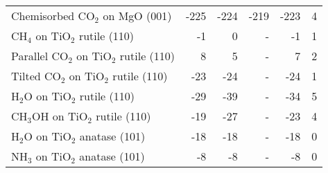 \begin{table}
\begin{adjustbox}{center,max width=1\textwidth}
\begin{tabular}{lrrrrr}
Chemisorbed CO$_2$ on MgO (001) & -225 & -224 & -219 & -223 & 4 \\
CH$_4$ on TiO$_2$ rutile (110) & -1 & 0 & - & -1 & 1 \\
Parallel CO$_2$ on TiO$_2$ rutile (110) & 8 & 5 & - & 7 & 2 \\
Tilted CO$_2$ on TiO$_2$ rutile (110) & -23 & -24 & - & -24 & 1 \\
H$_2$O on TiO$_2$ rutile (110) & -29 & -39 & - & -34 & 5 \\
CH$_3$OH on TiO$_2$ rutile (110) & -19 & -27 & - & -23 & 4 \\
H$_2$O on TiO$_2$ anatase (101) & -18 & -18 & - & -18 & 0 \\
NH$_3$ on TiO$_2$ anatase (101) & -8 & -8 & - & -8 & 0 \\
\bottomrule
\end{tabular}
\end{adjustbox}
\end{table}